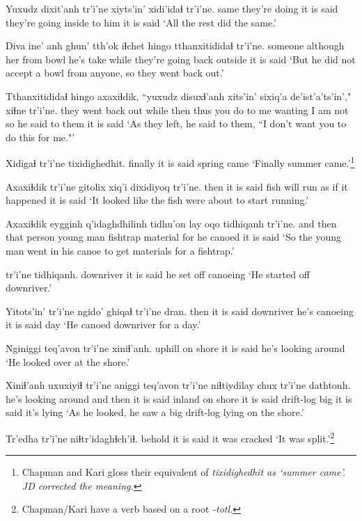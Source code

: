 \documentclass[12pt]{article}
\begin{document}
\gll Yuxudz dixit'anh tr'i'ne {xiyts'in' xidi'idaɬ} tr'i'ne.
same {they're doing} {it is said} {they're going inside  to him} {it is said}
\glt `All the rest did the same.'
\glend

\gll Diva ine' anh ghun'  tth'ok  iɬchet  hingo tthanxitididaɬ tr'i'ne.
someone although her from bowl  {he's take} while {they're going back outside} {it is said} 
\glt `But he did not accept a bowl from anyone, so they went back out.'
\glend

\gll Tthanxitididaɬ hingo  axaxiɬdik, ``yuxudz disuxɬ'anh xits'in' sixiq'a  {de'ist'a'ts'in',"} xiɬne   tr'i'ne.
{they went back out} while then thus {you do to me} {} wanting {I am not so} {he said to them} {it is said}
\glt `As they left, he said to them, ``I don't want you to do this for me."'
\glend

\gll Xidigaɬ tr'i'ne tixidighedhit.
finally  {it is said} {spring came}
\glt `Finally summer came.'\footnote{Chapman and Kari gloss their equivalent of \em tixidighedhit \em as `summer came'. JD corrected the meaning.}
\glend

\gll Axaxiɬdik tr'i'ne gitolix xiq'i dixidiyoq tr'i'ne.
then  {it is said} {fish will run} {as if} {it happened} {it is said}
\glt `It looked like the fish were about to start running.'
\glend

\gll Axaxiɬdik eygginh q'idaghdhilinh tidhu'on lay  oqo tidhiqanh tr'i'ne.
{and then} {that person} {young man} fishtrap material for {he canoed} {it is said}
\glt `So the young man went in his canoe to get materials for a fishtrap.'
\glend

 tr'i'ne tidhiqanh.
downriver {it is said} {he set off canoeing}
\glt `He started off downriver.'
\glend

\gll Yitots'in' tr'i'ne ngido' ghiqaɬ  tr'i'ne dran.
then  {it is said} downriver {he's canoeing} {it is said} day
\glt `He canoed downriver for a day.'
\glend

\gll Nginiggi teq'avon tr'i'ne xiniɬ'anh.
uphill  {on shore} {it is said} {he's looking around}
\glt `He looked over at the shore.'
\glend

\gll Xiniɬ'anh uxuxiyiɬ tr'i'ne aniggi teq'avon tr'i'ne niɬtiydilay chux tr'i'ne  dathtonh.
{he's looking around} {and then} {it is said} inland {on shore} {it is said} drift-log  big {it is said} {it's lying}
\glt `As he looked, he saw a big drift-log lying on the shore.' 
\glend

\gll Tr'edha tr'i'ne niɬtr'idaghɬch'iɬ.
behold  {it is said} {it was cracked}
\glt `It was split.'\footnote{Chapman/Kari have a verb based on a root \em -totl.}
\glend
\end{document}

